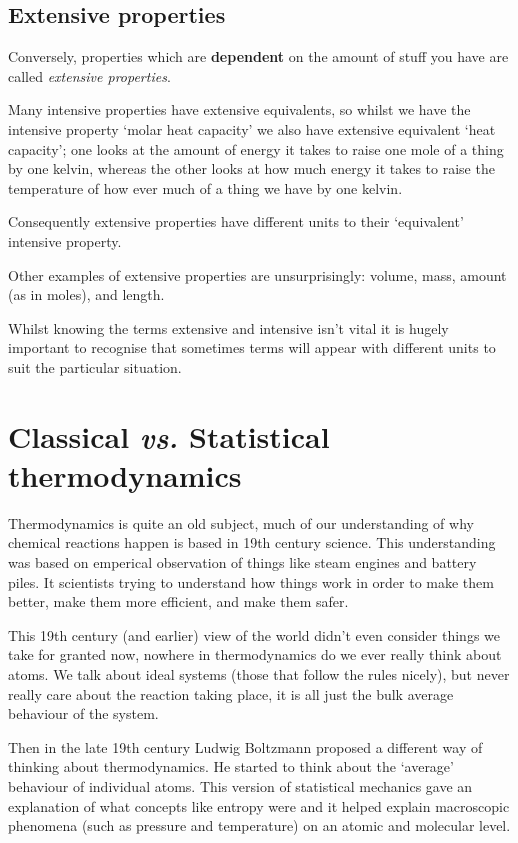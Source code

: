 \documentclass[
]{book}
\begin{document}
\hypertarget{sec:extensive}{%
\subsection{Extensive properties}\label{sec:extensive}}

Conversely, properties which are \textbf{dependent} on the amount of stuff you have are called \emph{extensive properties}.

Many intensive properties have extensive equivalents, so whilst we have the intensive property `molar heat capacity' we also have extensive equivalent `heat capacity'; one looks at the amount of energy it takes to raise one mole of a thing by one kelvin, whereas the other looks at how much energy it takes to raise the temperature of how ever much of a thing we have by one kelvin.

Consequently extensive properties have different units to their `equivalent' intensive property.

Other examples of extensive properties are unsurprisingly: volume, mass, amount (as in moles), and length.

Whilst knowing the terms extensive and intensive isn't vital it is hugely important to recognise that sometimes terms will appear with different units to suit the particular situation.

\hypertarget{sec:classicalstat}{%
\section{\texorpdfstring{Classical \emph{vs.} Statistical thermodynamics}{Classical vs. Statistical thermodynamics}}\label{sec:classicalstat}}

Thermodynamics is quite an old subject, much of our understanding of why chemical reactions happen is based in 19th century science. This understanding was based on emperical observation of things like steam engines and battery piles. It scientists trying to understand how things work in order to make them better, make them more efficient, and make them safer.

This 19th century (and earlier) view of the world didn't even consider things we take for granted now, nowhere in thermodynamics do we ever really think about atoms. We talk about ideal systems (those that follow the rules nicely), but never really care about the reaction taking place, it is all just the bulk average behaviour of the system.

Then in the late 19th century Ludwig Boltzmann proposed a different way of thinking about thermodynamics. He started to think about the `average' behaviour of individual atoms. This version of statistical mechanics gave an explanation of what concepts like entropy were and it helped explain macroscopic phenomena (such as pressure and temperature) on an atomic and molecular level.
\end{document}
